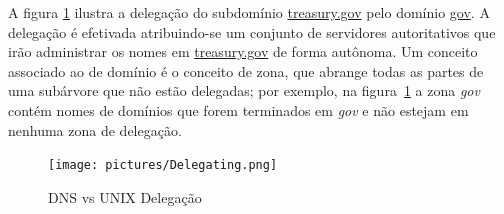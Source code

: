
A figura \ref{fig:delegation} ilustra a delegação do subdomínio
\url{treasury.gov} pelo domínio \url{gov}. A delegação é efetivada
atribuindo-se um conjunto de servidores autoritativos que irão
administrar os nomes em \url{treasury.gov} de forma autônoma. Um
conceito associado ao de domínio é o conceito de zona, que abrange
todas as partes de uma subárvore que não estão delegadas; por exemplo,
na figura~\ref{fig:delegation} a zona \textit{gov} contém nomes de
domínios que forem terminados em \textit{gov} e não estejam em nenhuma
zona de delegação.


    \begin{figure}[ht]
        \centering
        \texttt{[image: pictures/Delegating.png]}
        \caption{DNS vs UNIX Delegação }        
        \label{fig:delegation}
    \end{figure}
    \FloatBarrier



